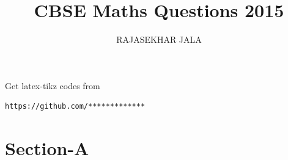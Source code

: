 \documentclass[journal,12pt,twocolumn]{IEEEtran}
\begin{document}
     \def\rightbox#1{\makebox[0in][r]{#1}}
     \def\centbox#1{\makebox[0in]{#1}}
     \def\topbox#1{\raisebox{-\baselineskip}[0in][0in]{#1}}
     \def\midbox#1{\raisebox{-0.5\baselineskip}[0in][0in]{#1}}
\vspace{3cm}
\title{CBSE Maths Questions 2015}
\author{RAJASEKHAR JALA }
\maketitle
\newpage
\bigskip
\renewcommand{\thefigure}{\theenumi}
\renewcommand{\thetable}{\theenumi}
%
Get latex-tikz codes from 
%
\begin{lstlisting}
https://github.com/*************
\end{lstlisting}
\section{Section-A}
\end{document}
